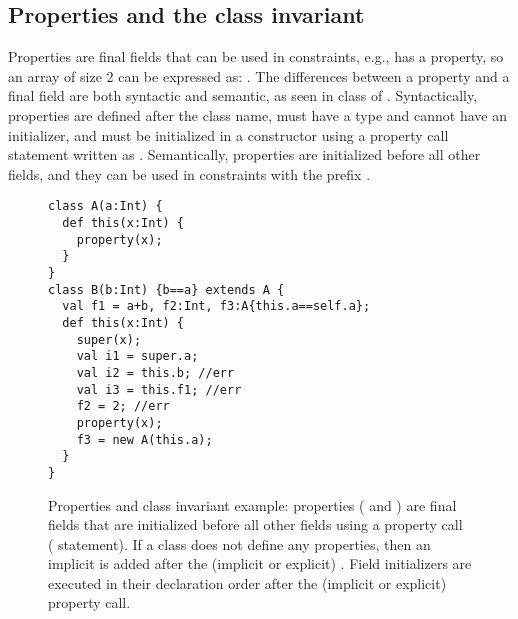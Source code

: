 \subsection{Properties and the class invariant}
Properties are final fields that can be used in constraints,
    e.g.,  has a  property,
    so an array of size 2 can be expressed as: .
The differences between a property and a final field are both syntactic and semantic,
    as seen in class  of .
Syntactically, properties are defined after the class name,
    must have a type and cannot have an initializer,
    and must be initialized in a constructor using a property call statement written as .
Semantically, properties are initialized before all other fields,
    and they can be used in constraints with the prefix .


\begin{figure}
\vspace{-0.2cm}\begin{lstlisting}
class A(a:Int) {
  def this(x:Int) {
    property(x);
  }
}
class B(b:Int) {b==a} extends A {
  val f1 = a+b, f2:Int, f3:A{this.a==self.a};
  def this(x:Int) {
    super(x);
    val i1 = super.a;
    val i2 = this.b; //err
    val i3 = this.f1; //err
    f2 = 2; //err
    property(x);
    f3 = new A(this.a);
  }
}
\end{lstlisting}\vspace{-0.2cm}
\caption{Properties and class invariant example:
        properties ( and )
        are final fields that are initialized before all other fields
        using a property call ( statement).
    {If a class does not define any properties, then
        an implicit  is added
        after the (implicit or explicit) .}
    {Field initializers are executed in their declaration order
        after the (implicit or explicit) property call.}
    }
\label{Figure:Properties}
\end{figure}


